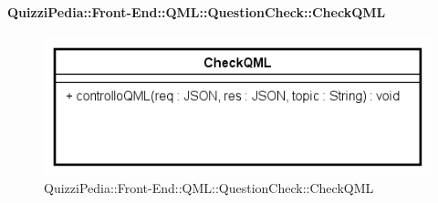 \paragraph[QuizziPedia::Front-End::QML:: \\ QuestionCheck::CheckQML]{QuizziPedia::Front-End::QML::QuestionCheck::CheckQML}
\begin{figure} [ht]
	\centering
	\includegraphics[scale=0.32]{UML/Classi/Front-End/QuizziPedia_Front-end_QML_QuestionCheck_CheckQML.png}
	\caption{QuizziPedia::Front-End::QML::QuestionCheck::CheckQML}
\end{figure} \FloatBarrier
